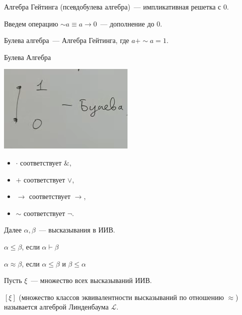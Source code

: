 \begin{definition}
    Алгебра Гейтинга (псевдобулева алгебра)~--- импликативная решетка с 0.
\end{definition}

\begin{definition}
    Введем операцию $\sim a \equiv a \to 0$~--- дополнение до 0.
\end{definition}
\begin{definition}
    Булева алгебра~--- Алгебра Гейтинга, где $a + \sim a = 1$.
\end{definition}

\begin{example}
    Булева Алгебра

    \includegraphics[scale=0.8]{img/bool_algebra}

    \begin{itemize}
        \item $\cdot$ соответствует $\&$,
        \item $+$ соответствует $\vee$,
        \item $\to$ соответствует $\to$,
        \item $\sim$ соответствует $\neg$.
    \end{itemize}
\end{example}

Далее $\alpha, \beta$~--- высказывания в ИИВ.

\begin{definition}
    $\alpha \leqslant \beta$, если $\alpha \vdash \beta$
\end{definition}

\begin{definition}
    $\alpha \approx \beta$, если $\alpha \leqslant \beta$ и $\beta \leqslant \alpha$
\end{definition}

\begin{definition}
    Пусть $\xi$~--- множество всех высказываний ИИВ.

    $[ \xi ]$ (множество классов эквивалентности высказываний по отношению $\approx$) называется алгеброй Линденбаума $\mathcal{L}$.
\end{definition}

